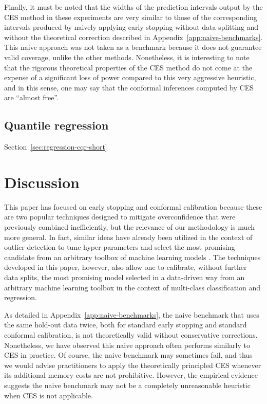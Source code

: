 Finally, it must be noted that the widths of the prediction intervals output by the CES method in these experiments are very similar to those of the corresponding intervals produced by naively applying early stopping without data splitting and without the theoretical correction described in Appendix~\ref{app:naive-benchmarks}.
This naive approach was not taken as a benchmark because it does not guarantee valid coverage, unlike the other methods. Nonetheless, it is interesting to note that the rigorous theoretical properties of the CES method do not come at the expense of a significant loss of power compared to this very aggressive heuristic, and in this sense, one may say that the conformal inferences computed by CES are ``almost free''.


\subsection{Quantile regression}

Section~\ref{sec:regression-cqr-short}


\section{Discussion} \label{sec:discussion}

This paper has focused on early stopping and conformal calibration because these are two popular techniques designed to mitigate overconfidence that were previously combined  inefficiently, but the relevance of our methodology is much more general.
In fact, similar ideas have already been utilized in the context of outlier detection to tune hyper-parameters and select the most promising candidate from an arbitrary toolbox of machine learning models \cite{Liang_2022_integrative_p_val}.
The techniques developed in this paper, however, also allow one to calibrate, without further data splits, the most promising model selected in a data-driven way from an arbitrary machine learning toolbox in the context of multi-class classification and regression.

As detailed in Appendix~\ref{app:naive-benchmarks}, the naive benchmark that uses the same hold-out data twice, both for standard early stopping and standard conformal calibration, is not theoretically valid without conservative corrections. Nonetheless, we have observed this naive approach often performs similarly to CES in practice.
Of course, the naive benchmark may sometimes fail, and thus we would advise practitioners to apply the theoretically principled CES whenever its additional memory costs are not prohibitive. However, the empirical evidence suggests the naive benchmark may not be a completely unreasonable heuristic when CES is not applicable.


